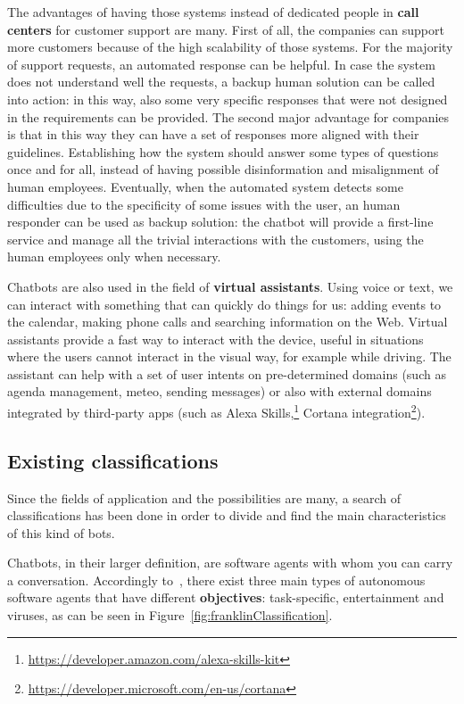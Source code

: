 The advantages of having those systems instead of dedicated people in \textbf{call centers} for customer support are many. First of all, the companies can support more customers because of the high scalability of those systems. For the majority of support requests, an automated response can be helpful. In case the system does not understand well the requests, a backup human solution can be called into action: in this way, also some very specific responses that were not designed in the requirements can be provided. The second major advantage for companies is that in this way they can have a set of responses more aligned with their guidelines. Establishing how the system should answer some types of questions once and for all, instead of having possible disinformation and misalignment of human employees. Eventually, when the automated system detects some difficulties due to the specificity of some issues with the user, an human responder can be used as backup solution: the chatbot will provide a first-line service and manage all the trivial interactions with the customers, using the human employees only when necessary.

Chatbots are also used in the field of \textbf{virtual assistants}. Using voice or text, we can interact with something that can quickly do things for us: adding events to the calendar, making phone calls and searching information on the Web. Virtual assistants provide a fast way to interact with the device, useful in situations where the users cannot interact in the visual way, for example while driving. The assistant can help with a set of user intents on pre-determined domains (such as agenda management, meteo, sending messages) or also with external domains integrated by third-party apps (such as Alexa Skills,\footnote{\url{https://developer.amazon.com/alexa-skills-kit}} Cortana integration\footnote{\url{https://developer.microsoft.com/en-us/cortana}}).

\subsection{Existing classifications}
\label{soaClassificationsExisting}

Since the fields of application and the possibilities are many, a search of classifications has been done in order to divide and find the main characteristics of this kind of bots.

Chatbots, in their larger definition, are software agents with whom you can carry a conversation. Accordingly to~\cite{franklin1996agent}, there exist three main types of autonomous software agents that have different \textbf{objectives}: task-specific, entertainment and viruses, as can be seen in Figure~\ref{fig:franklinClassification}.

